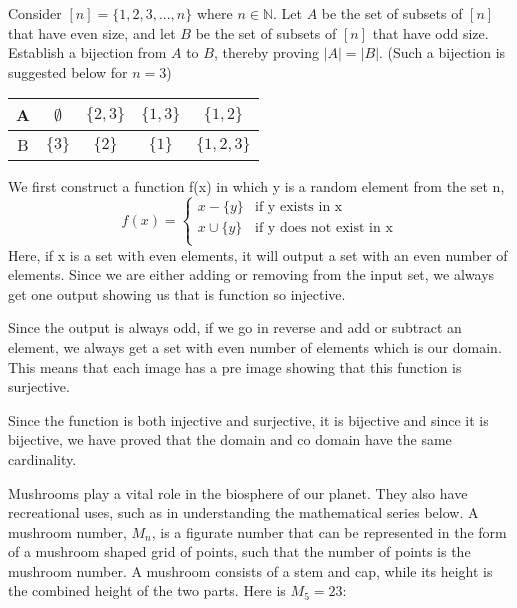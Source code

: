 \documentclass[addpoints]{exam}
\begin{document}
\begin{questions}
\question[15] Consider $[n] = \{1,2,3,...,n\}$ where $n \in \mathbb{N}$. Let $A$ be the set of subsets of $[n]$ that have even size, and let $B$ be the set of subsets of $[n]$ that have odd size. Establish a bijection from $A$ to $B$, thereby proving $|A| = |B|$. (Such a bijection is suggested below for $n = 3$) 

\begin{center}

  \begin{tabular}{ |c || c | c | c |c |}
    \hline
 A & $\emptyset$ & $\{2,3\}$ & $\{1,3\}$ & $\{1,2\}$ \\ \hline
 B & $\{3\}$ & $\{2\}$ & $\{1\}$ & $\{1,2,3\}$\\\hline
\end{tabular}
\end{center}

  \begin{solution}
    We first construct a function f(x) in which y is a random element from the set n,
    \[ f(x)=
    \begin{cases} 
      x-\{y\} &  \textrm{if y exists in x}\\
      x \cup \{y\} & \textrm{if y does not exist in x}  \\
   \end{cases}
    \]
    Here,  if x is a set with even elements, it will output a set with an even number of elements. Since we are either adding or removing from the input set, we always get one output showing us that is function so injective.
    
    Since the output is always odd, if we go in reverse and add or subtract an element, we always get a set with even number of elements which is our domain. This means that each image has a pre image showing that this function is surjective.
    
    Since the function is both injective and surjective, it is bijective and since it is bijective, we have proved that the domain and co domain have the same cardinality.
  \end{solution}
  
\question Mushrooms play a vital role in the biosphere of our planet. They also have recreational uses, such as in understanding the mathematical series below. A mushroom number, $M_n$, is a figurate number that can be represented in the form of a mushroom shaped grid of points, such that the number of points is the mushroom number. A mushroom consists of a stem and cap, while its height is the combined height of the two parts. Here is $M_5=23$:


\end{questions}
\end{document}
